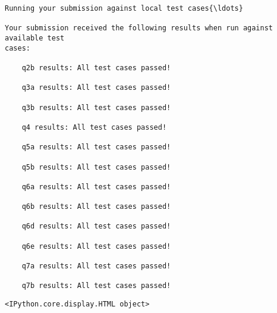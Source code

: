 \documentclass[11pt]{article}
\makeatletter
\newcommand{\boxspacing}{\kern\kvtcb@left@rule\kern\kvtcb@boxsep}
\newcommand{\prompt}[4]{
        {\ttfamily\llap{{\color{#2}[#3]:\hspace{3pt}#4}}\vspace{-\baselineskip}}
    }
\makeatother
\begin{document}
    \begin{Verbatim}[commandchars=\\\{\}]
Running your submission against local test cases{\ldots}

Your submission received the following results when run against available test
cases:

    q2b results: All test cases passed!

    q3a results: All test cases passed!

    q3b results: All test cases passed!

    q4 results: All test cases passed!

    q5a results: All test cases passed!

    q5b results: All test cases passed!

    q6a results: All test cases passed!

    q6b results: All test cases passed!

    q6d results: All test cases passed!

    q6e results: All test cases passed!

    q7a results: All test cases passed!

    q7b results: All test cases passed!
    \end{Verbatim}

    
    \begin{Verbatim}[commandchars=\\\{\}]
<IPython.core.display.HTML object>
    \end{Verbatim}

    
    

    \begin{tcolorbox}[breakable, size=fbox, boxrule=1pt, pad at break*=1mm,colback=cellbackground, colframe=cellborder]
\prompt{In}{incolor}{ }{\boxspacing}
\begin{Verbatim}[commandchars=\\\{\}]

\end{Verbatim}
\end{tcolorbox}


    
    
    
\end{document}
